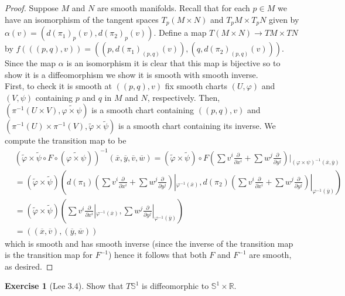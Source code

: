 \documentclass{article}
\newcommand{\bR}{\mathbb{R}}
\newcommand{\vp}{\varphi}
\newcommand{\bS}{\mathbb{S}}
\theoremstyle{definition}
\newtheorem{exercise}{Exercise}
\begin{document}
\begin{proof}
    Suppose $M$ and $N$ are smooth manifolds. Recall that for each $p \in M$ we have an isomorphism of the tangent spaces $T_p(M \times N)$ and $T_p M \times T_p N$ given by $\alpha(v) = (d(\pi_1)_p(v), d(\pi_2)_p(v))$. Define a map $T(M \times N) \to T M \times TN$ by $f (((p,q), v)) = ( (p, d(\pi_1)_{(p,q)} (v)), (q, d(\pi_2)_{(p,q)}(v)))$. Since the map $\alpha$ is an isomorphism it is clear that this map is bijective so to show it is a diffeomorphism we show it is smooth with smooth inverse. \\ 
    First, to check it is smooth at $((p,q), v)$ fix smooth charts $(U, \vp)$ and $(V, \psi)$ containing $p$ and $q$ in $M$ and $N$, respectively. Then, $(\pi^{-1}(U \times V), \widetilde{\vp \times \psi})$ is a smooth chart containing $((p,q), v)$ and $(\pi^{-1}(U) \times \pi^{-1}(V), \tilde{\vp} \times \tilde{\psi})$ is a smooth chart containing its inverse. We compute the transition map to be 
    \begin{align*}
        & (\tilde{\vp} \times \tilde{\psi} \circ F \circ (\widetilde{\vp \times \psi}))^{-1}(\overline{x}, \overline{y}, \overline{v}, \overline{w}) = (\tilde{\vp} \times \tilde{\psi}) \circ F \left( \sum v^i \frac{\partial}{\partial x^i} + \sum w^j \frac{\partial}{\partial y^j} \right)|_{(\vp \times \psi)^{-1}(\overline{x}, \overline{y})} \\ 
         & = (\tilde{\vp} \times \tilde{\psi})\left(d(\pi_1)\left(\sum v^i \frac{\partial}{\partial x^i} + \sum w^j \frac{\partial}{\partial y^j} \right)|_{\vp^{-1}(\overline{x})}, d(\pi_2)\left(\sum v^i \frac{\partial}{\partial x^i} + \sum w^j \frac{\partial}{\partial y^j} \right)|_{\vp^{-1}(\overline{y})}\right) \\
         & = (\tilde{\vp} \times \tilde{\psi})\left(\sum v^i \frac{\partial}{\partial x^i}|_{\vp^{-1}(\overline{x})}, \sum w^j \frac{\partial}{\partial y^j}|_{\vp^{-1}(\overline{y})}\right) \\ 
         & = ((\overline{x}, \overline{v}), (\overline{y}, \overline{w})) 
    \end{align*}
    which is smooth and has smooth inverse (since the inverse of the transition map is the transition map for $F^{-1}$) hence it follows that both $F$ and $F^{-1}$ are smooth, as desired. 
\end{proof}

\begin{exercise}[Lee 3.4]
    Show that $T \bS^1$ is diffeomorphic to $\bS^1 \times \bR$. 
\end{exercise}
\end{document}
